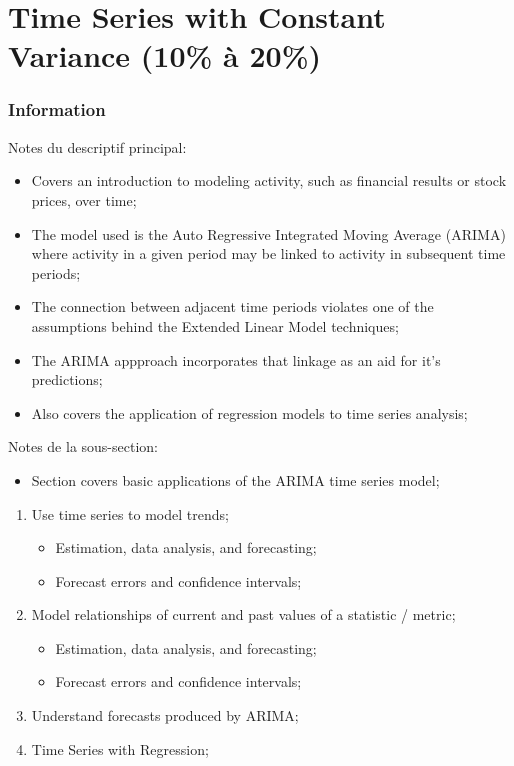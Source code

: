\documentclass[12pt, titlepage, french]{report}
\begin{document}
\newpage

\chapter[Time Series with Constant Variance]{Time Series with Constant Variance (10\% à 20\%)}

\subsection{Information}

\begin{distributions}[Description]
Notes du descriptif principal:
\begin{itemize}
	\item	Covers an introduction to modeling activity, such as financial results or stock prices, over time;
	\item	The model used is the Auto Regressive Integrated Moving Average (ARIMA) where activity in a given period may be linked to activity in subsequent time periods;
	\item	The connection between adjacent time periods violates one of the assumptions behind the Extended Linear Model techniques;
	\item	The ARIMA appproach incorporates that linkage as an aid for it's predictions;
	\item	Also covers the application of regression models to time series analysis;
\end{itemize}
\tcbline
Notes de la sous-section:
\begin{itemize}
	\item	Section covers basic applications of the ARIMA time series model;
\end{itemize}
\end{distributions}

\begin{outcomes}
\begin{enumerate}
	\item	Use time series to model trends;
		\begin{itemize}
		\item	Estimation, data analysis, and forecasting;
		\item	Forecast errors and confidence intervals;
		\end{itemize}
\tcbline
	\item	Model relationships of current and past values of a statistic / metric;
		\begin{itemize}
		\item	Estimation, data analysis, and forecasting;
		\item	Forecast errors and confidence intervals;
		\end{itemize}
\tcbline
	\item	Understand forecasts produced by ARIMA;
\tcbline
	\item	Time Series with Regression;
\end{enumerate}
\end{outcomes}
\end{document}
